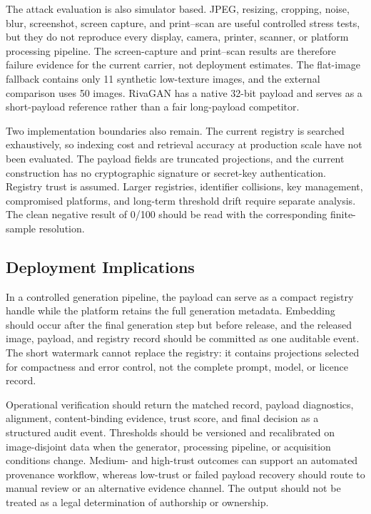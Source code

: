 \documentclass[a4paper,fleqn]{cas-sc}
\begin{document}
The attack evaluation is also simulator based. JPEG, resizing, cropping, noise,
blur, screenshot, screen capture, and print--scan are useful controlled stress
tests, but they do not reproduce every display, camera, printer, scanner, or
platform processing pipeline. The screen-capture and print--scan results are
therefore failure evidence for the current carrier, not deployment estimates.
The flat-image fallback contains only 11 synthetic low-texture images, and the
external comparison uses 50 images. RivaGAN has a native 32-bit payload and
serves as a short-payload reference rather than a fair long-payload competitor.

Two implementation boundaries also remain. The current registry is searched
exhaustively, so indexing cost and retrieval accuracy at production scale have
not been evaluated. The payload fields are truncated projections, and the
current construction has no cryptographic signature or secret-key
authentication. Registry trust is assumed. Larger registries, identifier
collisions, key management, compromised platforms, and long-term threshold
drift require separate analysis. The clean negative result of 0/100 should be
read with the corresponding finite-sample resolution.

\subsection{Deployment Implications}
In a controlled generation pipeline, the payload can serve as a compact
registry handle while the platform retains the full generation metadata.
Embedding should occur after the final generation step but before release, and
the released image, payload, and registry record should be committed as one
auditable event. The short watermark cannot replace the registry: it contains
projections selected for compactness and error control, not the complete prompt,
model, or licence record.

Operational verification should return the matched record, payload diagnostics,
alignment, content-binding evidence, trust score, and final decision as a
structured audit event. Thresholds should be versioned and recalibrated on
image-disjoint data when the generator, processing pipeline, or acquisition
conditions change. Medium- and high-trust outcomes can support an automated
provenance workflow, whereas low-trust or failed payload recovery should route
to manual review or an alternative evidence channel. The output should not be
treated as a legal determination of authorship or ownership.
\end{document}
